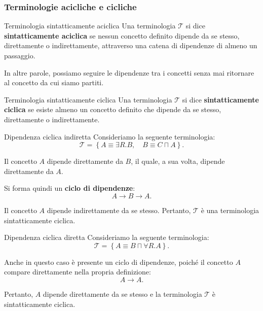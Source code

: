 \newpage

\subsubsection{Terminologie acicliche e cicliche}

\begin{definition}{Terminologia sintatticamente aciclica}
    Una terminologia $\mathcal{T}$ si dice
    \textbf{sintatticamente aciclica} se nessun concetto
    definito dipende da se stesso, direttamente o
    indirettamente, attraverso una catena di dipendenze
    di almeno un passaggio.

    In altre parole, possiamo seguire le dipendenze tra
    i concetti senza mai ritornare al concetto da cui
    siamo partiti.
\end{definition}

\begin{definition}{Terminologia sintatticamente ciclica}
    Una terminologia $\mathcal{T}$ si dice
    \textbf{sintatticamente ciclica} se esiste almeno
    un concetto definito che dipende da se stesso,
    direttamente o indirettamente.
\end{definition}

\begin{example}{Dipendenza ciclica indiretta}
    Consideriamo la seguente terminologia:
    \[
        \mathcal{T} =
        \left\{
            A \equiv \exists R.B,\quad
            B \equiv C \sqcap A
        \right\}.
    \]

    Il concetto $A$ dipende direttamente da $B$,
    il quale, a sua volta, dipende direttamente da $A$.

    Si forma quindi un \textbf{ciclo di dipendenze}:
    \[
        A \longrightarrow B \longrightarrow A.
    \]

    Il concetto $A$ dipende indirettamente da se stesso.
    Pertanto, $\mathcal{T}$ è una terminologia
    sintatticamente ciclica.
\end{example}

\begin{example}{Dipendenza ciclica diretta}
    Consideriamo la seguente terminologia:
    \[
        \mathcal{T} =
        \left\{A \equiv B \sqcap \forall R.A\right\}.
    \]

    Anche in questo caso è presente un ciclo di dipendenze,
    poiché il concetto $A$ compare direttamente nella
    propria definizione:
    \[
        A \longrightarrow A.
    \]

    Pertanto, $A$ dipende direttamente da se stesso
    e la terminologia $\mathcal{T}$ è sintatticamente
    ciclica.
\end{example}


